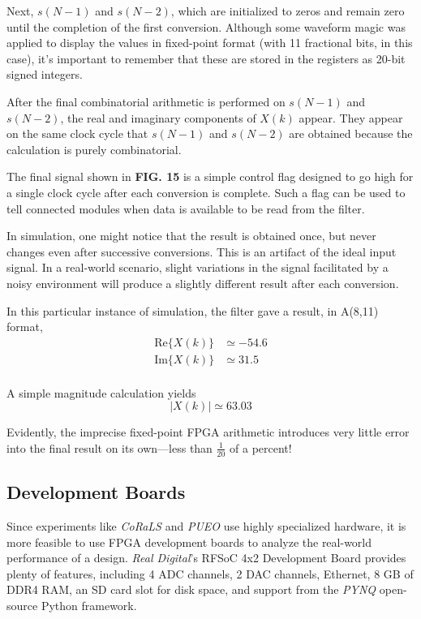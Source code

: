 \documentclass[reprint,amsmath,amssymb]{revtex4-2}
\begin{document}
 Next, $s(N-1)$ and $s(N-2)$, which are initialized to zeros and remain zero until the completion of the first conversion. Although some waveform magic was applied to display the values in fixed-point format (with 11 fractional bits, in this case), it's important to remember that these are stored in the registers as 20-bit signed integers.

 After the final combinatorial arithmetic is performed on $s(N-1)$ and $s(N-2)$, the real and imaginary components of $X(k)$ appear. They appear on the same clock cycle that $s(N-1)$ and $s(N-2)$ are obtained because the calculation is purely combinatorial.

 The final signal shown in \textbf{FIG. 15} is a simple control flag designed to go high for a single clock cycle after each conversion is complete. Such a flag can be used to tell connected modules when data is available to be read from the filter.

 In simulation, one might notice that the result is obtained once, but never changes even after successive conversions. This is an artifact of the ideal input signal. In a real-world scenario, slight variations in the signal facilitated by a noisy environment will produce a slightly different result after each conversion.

 In this particular instance of simulation, the filter gave a result, in A(8,11) format,
 \begin{align}
     \text{Re}\{X(k)\} & \simeq -54.6 \nonumber \\
     \text{Im}\{X(k)\} & \simeq 31.5 \nonumber \\ 
 \end{align}

 A simple magnitude calculation yields
 \begin{equation}
     |X(k)| \simeq 63.03
 \end{equation}

 Evidently, the imprecise fixed-point FPGA arithmetic introduces very little error into the final result on its own---less than $\frac{1}{20}$ of a percent!

\subsection{Development Boards}

Since experiments like \textit{CoRaLS} and \textit{PUEO} use highly specialized hardware, it is more feasible to use FPGA development boards to analyze the real-world performance of a design. \textit{Real Digital}'s RFSoC 4x2 Development Board provides plenty of features, including 4 ADC channels, 2 DAC channels, Ethernet, 8 GB of DDR4 RAM, an SD card slot for disk space, and support from the \textit{PYNQ} open-source Python framework.
\end{document}
